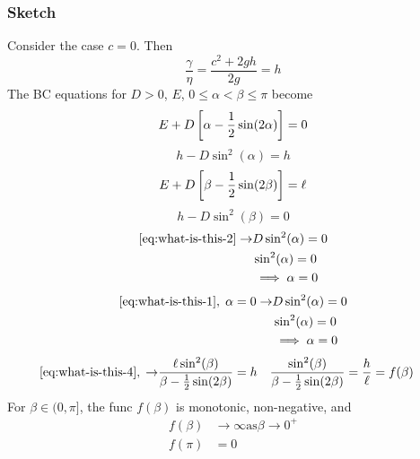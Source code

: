\documentclass[12pt,twoside]{article}
\begin{document}
\subsubsection{Sketch}
Consider the case $c=0$. Then
$$\frac{\gamma}{\eta}=\frac{c^2+2gh}{2g}=h$$
The BC equations for $D>0$, $E$, $0\le\alpha<\beta\le\pi$ become
\begin{equation}
  \label{eq:what-is-this-1}
  E + D\left[ \alpha-\frac{1}{2}\sin(2\alpha) \right] = 0 \\
\end{equation}
\begin{equation}
  \label{eq:what-is-this-2}
  h - D\sin^2(\alpha) = h
\end{equation}
\begin{equation}
  \label{eq:what-is-this-3}
  E + D\left[ \beta-\frac{1}{2}\sin(2\beta) \right] = \ell \\
\end{equation}
\begin{equation}
  \label{eq:what-is-this-4}
  h - D\sin^2(\beta) = 0
\end{equation}
\begin{align*}
  \text{\cref{eq:what-is-this-2}} \rightarrow& D\sin^2(\alpha)=0 \\
                                             & \sin^2(\alpha)=0 \\
                                             & \implies \alpha=0
\end{align*}
\begin{align*}
  \text{\cref{eq:what-is-this-1}},\;\alpha=0 \rightarrow& D\sin^2(\alpha)=0 \\
                                                        & \sin^2(\alpha)=0 \\
                                                        & \implies \alpha=0
\end{align*}
\begin{align*}
  \text{\cref{eq:what-is-this-4}},\; \rightarrow& \frac{\ell\sin^2(\beta)}{\beta-\frac{1}{2}\sin(2\beta)}=h
                                                & \frac{\sin^2(\beta)}{\beta-\frac{1}{2}\sin(2\beta)}=\frac{h}{\ell}
                                                & = f(\beta)
\end{align*}
For $\beta\in(0,\pi]$, the func $f(\beta)$ is monotonic, non-negative, and
\begin{align*}
  f(\beta)&\rightarrow\infty \text{as} \beta\rightarrow0^+ \\
  f(\pi) &= 0 \\
\end{align*}
\end{document}
